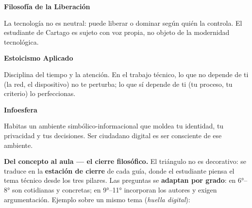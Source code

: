 \documentclass[12pt, a4paper]{article}
\begin{document}
\medskip
\noindent
\begin{minipage}[t]{0.31\textwidth}
\begin{tcolorbox}[
  enhanced,
  colback=vinoClaro,
  colframe=vinoInst,
  coltitle=white,
  colbacktitle=vinoInst,
  title={\small\textbf{Enrique Dussel}},
  fonttitle=\bfseries,
  arc=8pt,
  boxrule=2pt,
  left=4pt, right=4pt, top=4pt, bottom=4pt
]
{\small\textbf{Filosofía de la Liberación}

La tecnología no es neutral: puede liberar o dominar según quién la controla.
El estudiante de Cartago es sujeto con voz propia, no objeto de la modernidad
tecnológica.}
\end{tcolorbox}
\end{minipage}
\hfill
\begin{minipage}[t]{0.31\textwidth}
\begin{tcolorbox}[
  enhanced,
  colback=white!90!verdeTeal,
  colframe=verdeTeal,
  coltitle=white,
  colbacktitle=verdeTeal,
  title={\small\textbf{Marco Aurelio}},
  fonttitle=\bfseries,
  arc=8pt,
  boxrule=2pt,
  left=4pt, right=4pt, top=4pt, bottom=4pt
]
{\small\textbf{Estoicismo Aplicado}

Disciplina del tiempo y la atención. En el trabajo técnico, lo que no depende de ti
(la red, el dispositivo) no te perturba; lo que sí depende de ti
(tu proceso, tu criterio) lo perfeccionas.}
\end{tcolorbox}
\end{minipage}
\hfill
\begin{minipage}[t]{0.31\textwidth}
\begin{tcolorbox}[
  enhanced,
  colback=white!90!azulFloridi,
  colframe=azulFloridi,
  coltitle=white,
  colbacktitle=azulFloridi,
  title={\small\textbf{Luciano Floridi}},
  fonttitle=\bfseries,
  arc=8pt,
  boxrule=2pt,
  left=4pt, right=4pt, top=4pt, bottom=4pt
]
{\small\textbf{Infoesfera}

Habitas un ambiente simbólico-informacional que moldea tu identidad, tu
privacidad y tus decisiones. Ser ciudadano digital es ser consciente de
ese ambiente.}
\end{tcolorbox}
\end{minipage}
\medskip

\textbf{Del concepto al aula — el cierre filosófico.} El triángulo no es decorativo:
se traduce en la \textbf{estación de cierre} de cada guía, donde el estudiante
piensa el tema técnico desde los tres pilares. Las preguntas se \textbf{adaptan
por grado}: en 6°–8° son cotidianas y concretas; en 9°–11° incorporan los autores
y exigen argumentación. Ejemplo sobre un mismo tema (\textit{huella digital}):
\end{document}
